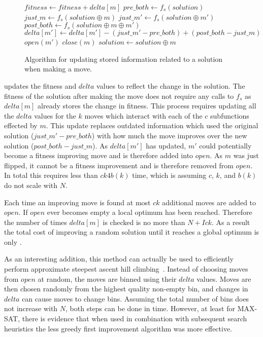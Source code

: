 \begin{figure}
  \begin{algorithmic}[1]
    \State $fitness \leftarrow fitness + delta[m]$
      \State $pre\_both \leftarrow f_s(solution)$
      \State $just\_m \leftarrow f_s(solution \oplus m)$
        \State $just\_m' \leftarrow f_s(solution \oplus m')$
        \State $post\_both \leftarrow f_s(solution \oplus m \oplus m')$
        \State $delta[m'] \leftarrow delta[m'] - (just\_m' - pre\_both) + (post\_both - just\_m)$
        \State $open(m')$
      \EndFor
    \EndFor
    \State $close(m)$
    \State $solution \leftarrow solution \oplus m$
  \EndProcedure
\end{algorithmic}
  \caption{Algorithm for updating stored information related to a solution when
           making a move.}
  \label{fig-make-move}
\end{figure}

 updates the fitness and $delta$ values to reflect the change in the solution. The fitness
of the solution after making the move does not require any calls to $f_s$ as $delta[m]$ already stores the
change in fitness. This process requires updating all the $delta$ values for the $k$ moves which interact with each of the $c$ subfunctions
effected by $m$. This update replaces outdated information which used the original solution ($just\_m' - pre\_both$)
with how much the move improves over the new solution ($post\_both - just\_m$). As $delta[m']$ has updated, $m'$ could
potentially become a fitness improving move and is therefore added into $open$. As $m$ was just flipped,
it cannot be a fitness improvement and is therefore removed from $open$.  In total this requires less than
$ck4b(k)$ time, which is  assuming $c$, $k$, and $b(k)$ do not scale with $N$.

Each time an improving move is found at most $ck$ additional moves are added to $open$. If $open$ ever
becomes empty a local optimum has been reached. Therefore the number of times $delta[m]$ is checked
is no more than $N + Ick$. As a result the total cost of improving a random solution until it reaches
a global optimum is only .

As an interesting addition, this method can actually be used to efficiently perform approximate steepest ascent hill
climbing~\cite{whitley:2013:greedy}. Instead of choosing moves from $open$ at random, the moves are binned
using their $delta$ values. Moves are then chosen randomly from the highest quality non-empty bin, and changes
in $delta$ can cause moves to change bins. Assuming the total number of bins does not increase with $N$, both steps
can be done in  time. However, at least for MAX-SAT, there is evidence that when used in combination with subsequent
search heuristics the less greedy first improvement algorithm was more effective.

